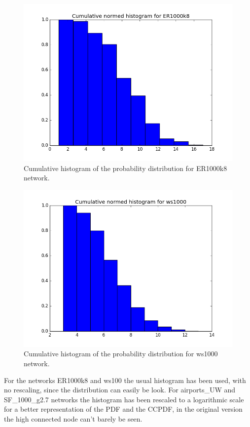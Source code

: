 \documentclass[12pt,a4paper,oneside]{article}
\numberwithin{equation}{section}
\numberwithin{equation}{section}
\theoremstyle{definition}
\begin{document}
\begin{figure}[h!]
	\centering
	\includegraphics[scale=0.5]{images/Cumu_norm_ER1000k8.png}
	\caption{Cumulative histogram of the probability distribution for ER1000k8 network.}
	\label{airport}
\end{figure}

\begin{figure}[h!]
	\centering
	\includegraphics[scale=0.5]{images/Cumu_norm_ws1000.png}
	\caption{Cumulative histogram of the probability distribution for ws1000 network.}
	\label{airport}
\end{figure}

For the networks ER1000k8 and ws100 the usual histogram has been used, with no rescaling, since the distribution can easily be look. For airports\_UW and SF\_1000\_g2.7 networks the histogram has been rescaled to a logarithmic scale for a better representation of the PDF and the CCPDF, in the original version the high connected node can't barely be seen.
\end{document}
